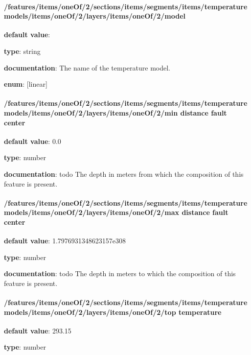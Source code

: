 \paragraph{/features/items/oneOf/2/sections/items/segments/items/temperature models/items/oneOf/2/layers/items/oneOf/2/model} \begin{itemized}
\item {\bf default value}: 
\item {\bf type}: string
\item {\bf documentation}: The name of the temperature model.
\item {\bf enum}: [linear]\end{itemized}\paragraph{/features/items/oneOf/2/sections/items/segments/items/temperature models/items/oneOf/2/layers/items/oneOf/2/min distance fault center} \begin{itemized}
\item {\bf default value}: 0.0
\item {\bf type}: number
\item {\bf documentation}: todo The depth in meters from which the composition of this feature is present.
\end{itemized}\paragraph{/features/items/oneOf/2/sections/items/segments/items/temperature models/items/oneOf/2/layers/items/oneOf/2/max distance fault center} \begin{itemized}
\item {\bf default value}: 1.7976931348623157e308
\item {\bf type}: number
\item {\bf documentation}: todo The depth in meters to which the composition of this feature is present.
\end{itemized}\paragraph{/features/items/oneOf/2/sections/items/segments/items/temperature models/items/oneOf/2/layers/items/oneOf/2/top temperature} \begin{itemized}
\item {\bf default value}: 293.15
\item {\bf type}: number

\end{itemized}
